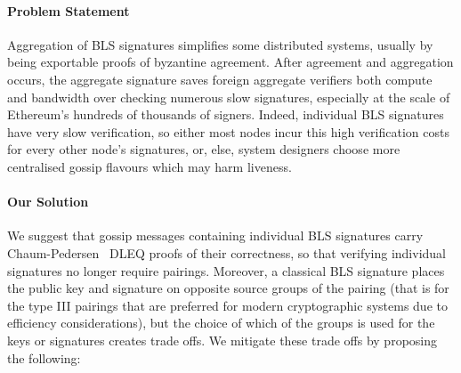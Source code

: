 \begin{comment}
Aggregation of BLS signatures simplifies some distributed systems,
usually by being an exportable proofs of byzantine agreement.
After agreement and aggregation occurs, the aggregate signature saves
foreign aggregate verifiers both compute and bandwidth over checking
numerous faster signature, especially as scales like Ethereum's hundreds of thousands of signers.

We do however handle individual BLS signatures before aggregation occurs.
Individual BLS signatures have extremely slow verification compared to alternatives
like Schnorr or ECDSA signatures dut to using pairings.
So either most nodes incur this high verification costs for every other node's
signatures, or else system designers choose more centralized gossip
flavors, which then harms liveness.
\end{comment}

\paragraph{Problem Statement} Aggregation of BLS signatures simplifies some distributed systems,
usually by being exportable proofs of byzantine agreement. After agreement and aggregation occurs, 
the aggregate signature saves foreign aggregate verifiers both compute and bandwidth over checking
numerous slow signatures, especially at the scale of Ethereum's hundreds of thousands of signers.
Indeed, individual BLS signatures have very slow verification, so either most nodes incur this high verification 
costs for every other node's signatures, or, else, system designers choose more centralised gossip
flavours which may harm liveness.

\begin{comment}
We suggest that gossip messages containing individual BLS signatures carry
a Chaum-Pedersen DLEQ proofs of their correctness, so that verifying
individual signatures no longer requires pairings.
%
We avoid complex bisection logic in aggregation this way too, but increase
signature message size by 32 bytes.
\end{comment}

\paragraph{Our Solution} We suggest that gossip messages containing individual 
BLS signatures carry Chaum-Pedersen~\cite{ChaumPedersen} DLEQ proofs of their correctness, so that 
verifying individual signatures no longer require pairings. Moreover, a classical BLS signature 
places the public key and signature on opposite source groups of the pairing (that is for the type III pairings that 
are preferred for modern cryptographic systems due to efficiency considerations), 
but the choice of which of the groups is used for the keys or signatures creates trade offs. 
We mitigate these trade offs by proposing the following:


